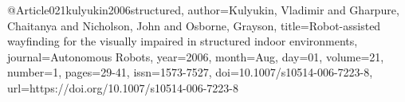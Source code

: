 @Article{021kulyukin2006structured,
author={Kulyukin, Vladimir
and Gharpure, Chaitanya
and Nicholson, John
and Osborne, Grayson},
title={Robot-assisted wayfinding for the visually impaired in structured indoor environments},
journal={Autonomous Robots},
year={2006},
month={Aug},
day={01},
volume={21},
number={1},
pages={29-41},
issn={1573-7527},
doi={10.1007/s10514-006-7223-8},
url={https://doi.org/10.1007/s10514-006-7223-8}
}